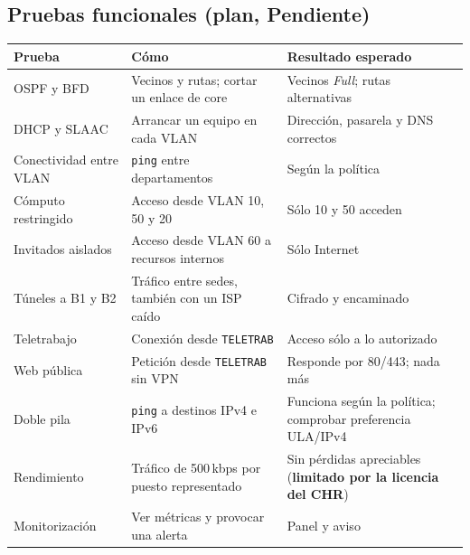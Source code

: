 \documentclass[11pt,a4paper]{article}
\newcommand{\cod}[1]{\texttt{#1}}
\newcommand{\pen}{\textcolor{rojo}{\textbf{Pendiente}}}
\begin{document}
\subsection{Pruebas funcionales (plan, \pen)}
\begingroup\footnotesize
\begin{longtable}{@{}p{3.5cm}p{6.5cm}p{4.5cm}@{}}
\toprule
\textbf{Prueba} & \textbf{Cómo} & \textbf{Resultado esperado}\\
\midrule
\endhead
OSPF y BFD & Vecinos y rutas; cortar un enlace de core & Vecinos \textit{Full}; rutas alternativas\\
DHCP y SLAAC & Arrancar un equipo en cada VLAN & Dirección, pasarela y DNS correctos\\
Conectividad entre VLAN & \cod{ping} entre departamentos & Según la política\\
Cómputo restringido & Acceso desde VLAN 10, 50 y 20 & Sólo 10 y 50 acceden\\
Invitados aislados & Acceso desde VLAN 60 a recursos internos & Sólo Internet\\
Túneles a B1 y B2 & Tráfico entre sedes, también con un ISP caído & Cifrado y encaminado\\
Teletrabajo & Conexión desde \cod{TELETRAB} & Acceso sólo a lo autorizado\\
Web pública & Petición desde \cod{TELETRAB} sin VPN & Responde por 80/443; nada más\\
Doble pila & \cod{ping} a destinos IPv4 e IPv6 & Funciona según la política; comprobar preferencia ULA/IPv4\\
Rendimiento & Tráfico de 500\,kbps por puesto representado & Sin pérdidas apreciables (\textbf{limitado por la licencia del CHR})\\
Monitorización & Ver métricas y provocar una alerta & Panel y aviso\\
\bottomrule
\end{longtable}
\endgroup
\end{document}
